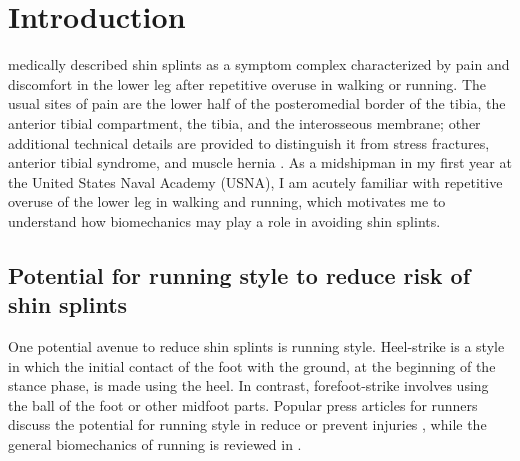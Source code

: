 \section{Introduction}

\citet{slocum1967shin} medically described shin splints as a symptom complex characterized by pain and discomfort in the lower leg after repetitive overuse in walking or running. The usual sites of pain are the lower half of the posteromedial border of the tibia, the anterior tibial compartment, the tibia, and the interosseous membrane; other additional technical details are provided to distinguish it from stress fractures, anterior tibial syndrome, and muscle hernia \citep{slocum1967shin}. As a midshipman in my first year at the United States Naval Academy (USNA), I am acutely familiar with repetitive overuse of the lower leg in walking and running, which motivates me to understand how biomechanics may play a role in avoiding shin splints. 

\subsection{Potential for running style to reduce risk of shin splints}
One potential avenue to reduce shin splints is running style. Heel-strike is a style in which the initial contact of the foot with the ground, at the beginning of the stance phase, is made using the heel. In contrast, forefoot-strike involves using the ball of the foot or other midfoot parts. Popular press articles for runners discuss the potential for running style in reduce or prevent injuries \citep{douglas2012midfoot, giandolini2013impact}, while the general biomechanics of running is reviewed in \citep{chan1994foot, lieberman2020biomechanical, bramble2004endurance, lieberman2010foot}. 

